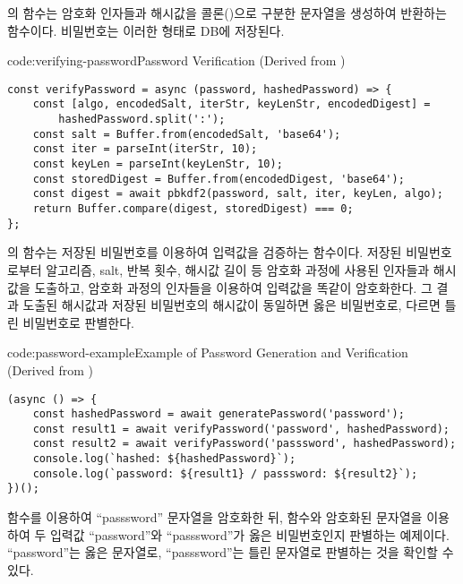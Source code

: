 의  함수는 암호화 인자들과 해시값을 콜론(\cd{:})으로 구분한 문자열을 생성하여 반환하는 함수이다. 비밀번호는 이러한 형태로 DB에 저장된다.
\newpage

\begin{codeenv}{code:verifying-password}{Password Verification (Derived from )}\begin{verbatim}
const verifyPassword = async (password, hashedPassword) => {
    const [algo, encodedSalt, iterStr, keyLenStr, encodedDigest] =
        hashedPassword.split(':');
    const salt = Buffer.from(encodedSalt, 'base64');
    const iter = parseInt(iterStr, 10);
    const keyLen = parseInt(keyLenStr, 10);
    const storedDigest = Buffer.from(encodedDigest, 'base64');
    const digest = await pbkdf2(password, salt, iter, keyLen, algo);
    return Buffer.compare(digest, storedDigest) === 0;
};
\end{verbatim}
\end{codeenv}

의  함수는 저장된 비밀번호를 이용하여 입력값을 검증하는 함수이다. 저장된 비밀번호로부터 알고리즘, salt, 반복 횟수, 해시값 길이 등 암호화 과정에 사용된 인자들과 해시값을 도출하고, 암호화 과정의 인자들을 이용하여 입력값을 똑같이 암호화한다. 그 결과 도출된 해시값과 저장된 비밀번호의 해시값이 동일하면 옳은 비밀번호로, 다르면 틀린 비밀번호로 판별한다.

\begin{codeenv}{code:password-example}{Example of Password Generation and Verification (Derived from )}\begin{verbatim}
(async () => {
    const hashedPassword = await generatePassword('password');
    const result1 = await verifyPassword('password', hashedPassword);
    const result2 = await verifyPassword('passsword', hashedPassword);
    console.log(`hashed: ${hashedPassword}`);
    console.log(`password: ${result1} / passsword: ${result2}`);
})();
\end{verbatim}
\end{codeenv}

\은  함수를 이용하여 ``passsword'' 문자열을 암호화한 뒤,  함수와 암호화된 문자열을 이용하여 두 입력값 ``password''와 ``passsword''가 옳은 비밀번호인지 판별하는 예제이다. ``password''는 옳은 문자열로, ``passsword''는 틀린 문자열로 판별하는 것을 확인할 수 있다.
